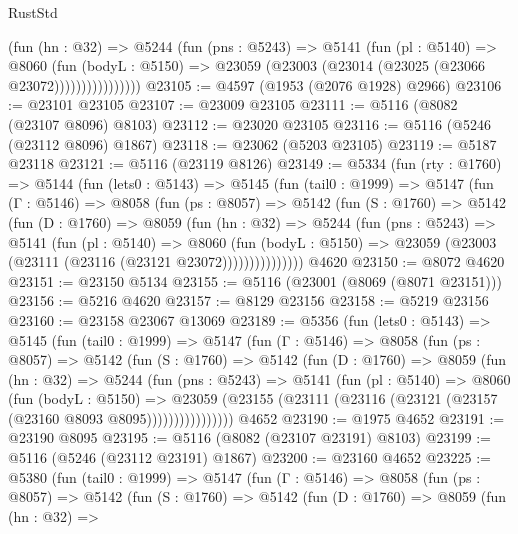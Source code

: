 \begin{lexlean}{RustStd}
\begin{coremodule}
                    (fun (hn : @32) =>
                    @5244
                      (fun (pns : @5243) =>
                      @5141
                        (fun (pl : @5140) =>
                        @8060
                          (fun (bodyL : @5150) =>
                          @23059 (@23003 (@23014 (@23025 (@23066 @23072))))))))))))))))
@23105 := @4597 (@1953 (@2076 @1928) @2966)
@23106 := @23101 @23105
@23107 := @23009 @23105
@23111 := @5116 (@8082 (@23107 @8096) @8103)
@23112 := @23020 @23105
@23116 := @5116 (@5246 (@23112 @8096) @1867)
@23118 := @23062 (@5203 @23105)
@23119 := @5187 @23118
@23121 := @5116 (@23119 @8126)
@23149 := @5334
    (fun (rty : @1760) =>
    @5144
      (fun (lets0 : @5143) =>
      @5145
        (fun (tail0 : @1999) =>
        @5147
          (fun (Γ : @5146) =>
          @8058
            (fun (ps : @8057) =>
            @5142
              (fun (S : @1760) =>
              @5142
                (fun (D : @1760) =>
                @8059
                  (fun (hn : @32) =>
                  @5244
                    (fun (pns : @5243) =>
                    @5141
                      (fun (pl : @5140) =>
                      @8060
                        (fun (bodyL : @5150) =>
                        @23059 (@23003 (@23111 (@23116 (@23121 @23072)))))))))))))))
    @4620
@23150 := @8072 @4620
@23151 := @23150 @5134
@23155 := @5116 (@23001 (@8069 (@8071 @23151)))
@23156 := @5216 @4620
@23157 := @8129 @23156
@23158 := @5219 @23156
@23160 := @23158 @23067 @13069
@23189 := @5356
    (fun (lets0 : @5143) =>
    @5145
      (fun (tail0 : @1999) =>
      @5147
        (fun (Γ : @5146) =>
        @8058
          (fun (ps : @8057) =>
          @5142
            (fun (S : @1760) =>
            @5142
              (fun (D : @1760) =>
              @8059
                (fun (hn : @32) =>
                @5244
                  (fun (pns : @5243) =>
                  @5141
                    (fun (pl : @5140) =>
                    @8060
                      (fun (bodyL : @5150) =>
                      @23059
                        (@23155 (@23111 (@23116 (@23121 (@23157 (@23160 @8093 @8095))))))))))))))))
    @4652
@23190 := @1975 @4652
@23191 := @23190 @8095
@23195 := @5116 (@8082 (@23107 @23191) @8103)
@23199 := @5116 (@5246 (@23112 @23191) @1867)
@23200 := @23160 @4652
@23225 := @5380
    (fun (tail0 : @1999) =>
    @5147
      (fun (Γ : @5146) =>
      @8058
        (fun (ps : @8057) =>
        @5142
          (fun (S : @1760) =>
          @5142
            (fun (D : @1760) =>
            @8059
              (fun (hn : @32) =>

\end{coremodule}
\end{lexlean}
